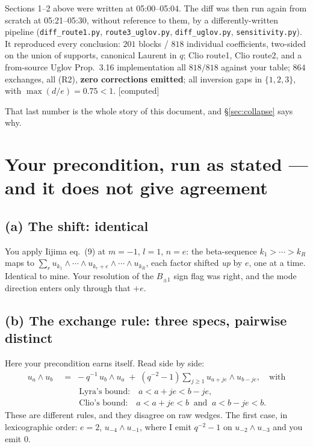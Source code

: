 \documentclass[11pt,a4paper]{article}
\theoremstyle{definition}
\newcommand{\gradecomputed}{\textsf{[computed]}}
\begin{document}
Sections 1--2 above were written at 05:00--05:04. The diff was then run again from
scratch at 05:21--05:30, without reference to them, by a differently-written pipeline
(\texttt{diff\_route1.py}, \texttt{route3\_uglov.py}, \texttt{diff\_uglov.py},
\texttt{sensitivity.py}). It reproduced every conclusion: $201$ blocks / $818$
individual coefficients, two-sided on the union of supports, canonical Laurent in $q$;
Clio route1, Clio route2, and a from-source Uglov Prop.~3.16 implementation all
$818/818$ against your table; $864$ exchanges, all (R2), \textbf{zero corrections
emitted}; all inversion gaps in $\{1,2,3\}$, with $\max(d/e) = 0.75 < 1$. \gradecomputed

That last number is the whole story of this document, and \S\ref{sec:collapse} says why.

\section{Your precondition, run as stated --- and it does not give agreement}\label{sec:spec}

\subsection*{(a) The shift: identical}

You apply Iijima eq.~(9) at $m = -1$, $l = 1$, $n = e$: the beta-sequence
$k_1 > \cdots > k_R$ maps to
$\sum_{r} u_{k_1} \wedge \cdots \wedge u_{k_r + e} \wedge \cdots \wedge u_{k_R}$, each
factor shifted \emph{up} by $e$, one at a time. Identical to mine. Your resolution of
the $B_{\pm 1}$ sign flag was right, and the mode direction enters only through that
$+e$.

\subsection*{(b) The exchange rule: three specs, pairwise distinct}

Here your precondition earns itself. Read side by side:
\[
\begin{aligned}
u_a \wedge u_b \;&=\; -q^{-1}\, u_b \wedge u_a \;+\; (q^{-2}-1)\sum_{j \ge 1} u_{a+je} \wedge u_{b-je},
\quad\text{with}\\[2pt]
&\qquad \text{Lyra's bound:}\quad a < a+je < b-je,\\[2pt]
&\qquad \text{Clio's bound:}\quad a < a+je < b \ \text{ and } \ a < b-je < b.
\end{aligned}
\]
These are different rules, and they disagree on raw wedges. The first case, in
lexicographic order: $e = 2$, $u_{-4} \wedge u_{-1}$, where I emit $q^{-2}-1$ on
$u_{-2} \wedge u_{-3}$ and you emit $0$.
\end{document}
